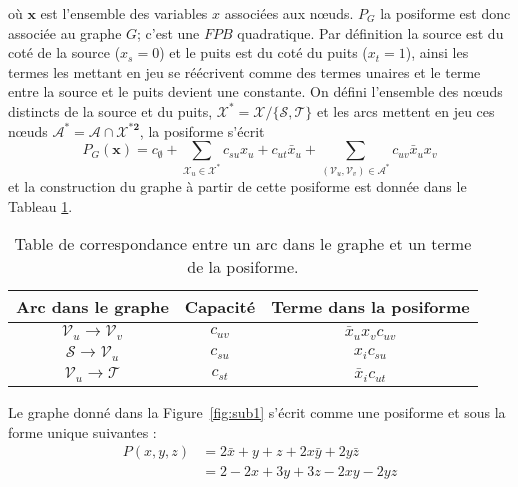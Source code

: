 \documentclass[../main/These_Mathias_Paget.tex]{subfiles}
\begin{document}
où $\boldsymbol{x}$ est l'ensemble des variables $x$ associées aux nœuds. $P_G$ la posiforme est donc associée au graphe $G$; c'est une $FPB$ quadratique. Par définition la source est du coté de la source ($x_{s}=0$) et le puits est du coté du puits ($x_{t}=1$), ainsi les termes les mettant en jeu se réécrivent comme des termes unaires et le terme entre la source et le puits devient une constante. On défini l’ensemble des nœuds distincts de la source et du puits, $\boldsymbol{\mathcal{X}^*} = \boldsymbol{\mathcal{X}} / \{\mathcal{S},\mathcal{T}\}$ et les arcs mettent en jeu ces nœuds $\boldsymbol{\mathcal{A}^*}=\boldsymbol{\mathcal{A}} \cap \boldsymbol{\mathcal{X}^{*2}}$, la posiforme s’écrit
	\begin{equation}
	\label{eq:posiforme_rep}
			P_G(\boldsymbol{x})= c_{\emptyset} + \sum_{\mathcal{X}_u \in \boldsymbol{\mathcal{X}^*}}{c_{su}x_u + c_{ut}\bar{x}_u}+ \sum_{(\mathcal{V}_u, \mathcal{V}_v) \in \boldsymbol{\mathcal{A^*}}}{ c_{uv}\bar{x}_ux_v }
	\end{equation}
et la construction du graphe à partir de cette posiforme est donnée dans le Tableau \ref{tab-constr-graph}.
	
\begin{table}[hb]
	\centering
	\begin{tabular}{c|c|c}
			Arc dans le graphe & Capacité & Terme dans la posiforme \\
			\hline
			$\mathcal{V}_u \rightarrow \mathcal{V}_v$ & $c_{uv}$ & $\bar{x}_ux_vc_{uv}$ \\
			$\mathcal{S} \rightarrow \mathcal{V}_u$ & $c_{su}$ & $x_ic_{su}$ \\
			$\mathcal{V}_u \rightarrow \mathcal{T}$ & $c_{st}$ & $\bar{x}_ic_{ut}$ \\
	\end{tabular}
	\caption{Table de correspondance entre un arc dans le graphe et un terme de la posiforme.}
	\label{tab-constr-graph}
\end{table}
		
	Le graphe donné dans la Figure~\ref{fig:sub1} s'écrit comme une posiforme et sous la forme unique suivantes :
	\begin{subequations}
		\begin{align}
        P(x,y,z) &= 2\bar{x} + y + z + 2x\bar{y} + 2y\bar{z} \label{eq:fonction_exemple_1} \\
        		 &= 2 - 2x + 3y + 3z - 2xy - 2yz
		\end{align}
	\end{subequations}
			
\end{document}
